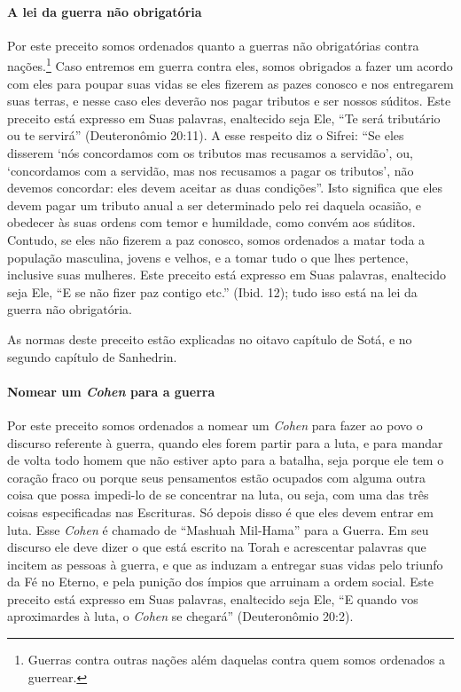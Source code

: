 \paragraph{A lei da guerra não obrigatória}

Por este preceito somos ordenados quanto a guerras não obrigatórias contra nações.\footnote{Guerras contra outras nações além daquelas contra quem somos
  ordenados a guerrear.} Caso entremos em guerra contra eles, somos obrigados
a fazer um acordo com eles para poupar suas vidas se eles fizerem as
pazes conosco e nos entregarem suas terras, e nesse caso eles deverão nos pagar
tributos e ser nossos súditos. Este preceito está expresso em Suas
palavras, enaltecido seja Ele, ``Te será tributário ou te servirá''
(Deuteronômio 20:11). A esse respeito diz o Sifrei: ``Se eles disserem
`nós concordamos com os tributos mas recusamos a servidão', ou,
`concordamos com a servidão, mas nos recusamos a pagar os tributos', não
devemos concordar: eles devem aceitar as duas condições''. Isto
significa que eles devem pagar um tributo anual a ser determinado pelo
rei daquela ocasião, e obedecer às suas ordens com temor e humildade,
como convém aos súditos. Contudo, se eles não fizerem a paz conosco,
somos ordenados a matar toda a população masculina, jovens e velhos, e a
tomar tudo o que lhes pertence, inclusive suas mulheres. Este preceito
está expresso em Suas palavras, enaltecido seja Ele, ``E se não fizer
paz contigo etc.'' (Ibid. 12); tudo isso está na lei da guerra não
obrigatória.

As normas deste preceito estão explicadas no oitavo capítulo de Sotá, e
no segundo capítulo de Sanhedrin.

\paragraph{Nomear um \textit{Cohen} para a guerra}

Por este preceito somos ordenados a nomear um \textit{Cohen} para fazer ao
povo o discurso referente à guerra, quando eles forem partir para a
luta, e para mandar de volta todo homem que não estiver apto para a batalha,
seja porque ele tem o coração fraco ou porque seus pensamentos estão
ocupados com alguma outra coisa que possa impedi-lo de se concentrar na
luta, ou seja, com uma das três coisas especificadas nas Escrituras. Só
depois disso é que eles devem entrar em luta. Esse \textit{Cohen} é chamado
de ``Mashuah Mil-Hama'' para a Guerra. Em seu discurso ele deve dizer o
que está escrito na Torah e acrescentar palavras que incitem as pessoas
à guerra, e que as induzam a entregar suas vidas pelo triunfo da Fé no
Eterno, e pela punição dos ímpios que arruinam a ordem social. Este
preceito está expresso em Suas palavras, enaltecido seja Ele, ``E quando
vos aproximardes à luta, o \textit{Cohen} se chegará'' (Deuteronômio 20:2).

